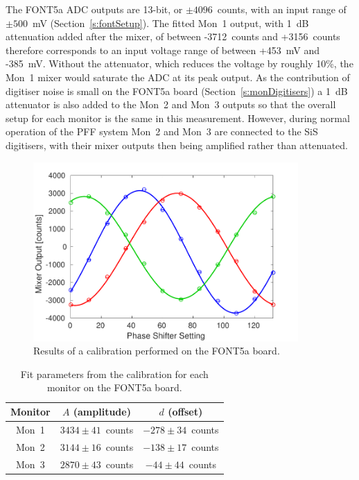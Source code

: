 The FONT5a ADC outputs are 13-bit, or \(\pm4096\)~counts, with an input range of \(\pm500\)~mV (Section~\ref{s:fontSetup}). The fitted Mon~1 output, with 1~dB attenuation added after the mixer, of between -3712~counts and +3156~counts therefore corresponds to an input voltage range of between +453~mV and -385~mV. Without the attenuator, which reduces the voltage by roughly 10\%, the Mon~1 mixer would saturate the ADC at its peak output. As the contribution of digitiser noise is small on the FONT5a board (Section~\ref{s:monDigitisers}) a 1~dB attenuator is also added to the Mon~2 and Mon~3 outputs so that the overall setup for each monitor is the same in this measurement. However, during normal operation of the PFF system Mon~2 and Mon~3 are connected to the SiS digitisers, with their mixer outputs then being amplified rather than attenuated.

\begin{figure}
  \centering
  \includegraphics[width=0.9\textwidth]{Figures/phaseMons/calFONT}
  \caption{Results of a calibration performed on the FONT5a board.}
  \label{f:calFONT}
\end{figure}


\begin{table}
  \begin{center}
    \begin{tabular}{|c c c|}
	   \hline
       Monitor & \(A\) (amplitude) & \(d\) (offset) \\ \hline
       Mon~1 & \(3434\pm41\)~counts & \(-278\pm34\)~counts \\ 
       Mon~2 & \(3144\pm16\)~counts & \(-138\pm17\)~counts\\
       Mon~3 & \(2870\pm43\)~counts & \(-44\pm44\)~counts\\ \hline
    \end{tabular}
    \caption{Fit parameters from the calibration for each monitor on the FONT5a board.}
  	\label{t:calFONTConsts}
  \end{center}
\end{table}

